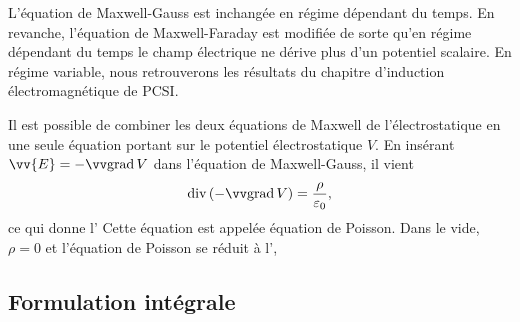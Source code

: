 \documentclass[12pt,fancy]{cours}
\begin{document}
  
\begin{remarque}
L'équation de Maxwell-Gauss est inchangée en régime dépendant du temps. En revanche, l'équation de Maxwell-Faraday est modifiée de sorte qu'en régime dépendant du temps le champ électrique ne dérive plus d'un potentiel scalaire. En régime variable, nous retrouverons les résultats du chapitre d'induction électromagnétique de PCSI.
\end{remarque}

Il est possible de combiner les deux équations de Maxwell de l'électrostatique en une seule équation portant sur le potentiel électrostatique $V$. En insérant $\vv{E}=-\grad{V}$ dans l'équation de Maxwell-Gauss, il vient
\begin{equation}
\dive{(-\grad{V})}=\frac{\rho}{\varepsilon_0},
\end{equation}
ce qui donne l’
Cette équation est appelée équation de Poisson. Dans le vide, $\rho=0$ et l’équation de Poisson se réduit à l’,

\subsection{Formulation intégrale}
\label{sec:integr}
\end{document}
